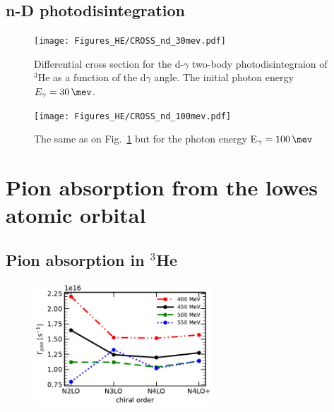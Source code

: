 \clearpage


\subsection{n-D photodisintegration}

\begin{figure}[h]
    \begin{center}
        \texttt{[image: Figures\_HE/CROSS\_nd\_30mev.pdf]}
        \end{center}
        \caption{Differential cross section for the d-$\gamma$ 
        two-body photodisintegraion of $^3$He as a function of the d$\gamma$ angle.
        The initial photon energy $E_\gamma=\SI{30}{\mev}$.}
        \label{CROSS_nd_30}
    \end{figure}


    \begin{figure}[h]
        \begin{center}
        \texttt{[image: Figures\_HE/CROSS\_nd\_100mev.pdf]}
        \end{center}
        \caption{The same as on Fig.~\ref{CROSS_nd_30} but 
        for the photon energy E$_\gamma=\SI{100}{\mev}$}
        \label{CROSS_nd_100}
    \end{figure}

    \clearpage
    \section{Pion absorption from the lowes atomic orbital}

    \subsection{Pion absorption in $^3$He}

    \begin{figure}[h]
        \begin{center}
        \includegraphics[width=0.6\textwidth]{PlotData/PION/Dalitz_maps/figures/Gamma_pnn.pdf}
        \end{center}
        \caption{}
        \label{Gamma_pnn}
    \end{figure}

